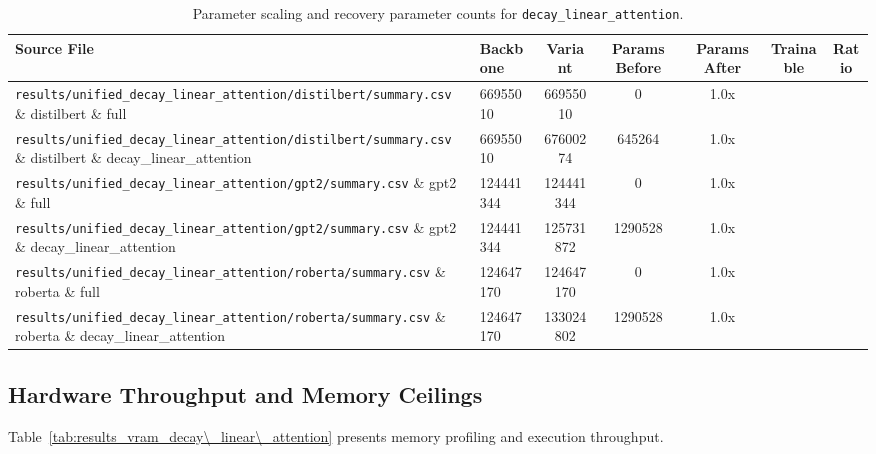 \begin{table}[t]
\centering
\small
\begin{tabularx}{\linewidth}{llccccc}
\toprule
\textbf{Source File} & \textbf{Backbone} & \textbf{Variant} & \textbf{Params Before} & \textbf{Params After} & \textbf{Trainable} & \textbf{Ratio} \\
\midrule
\texttt{results/unified\_decay\_linear\_attention/distilbert/summary.csv} \& distilbert \& full & 66955010 & 66955010 & 0 & 1.0x \\
\texttt{results/unified\_decay\_linear\_attention/distilbert/summary.csv} \& distilbert \& decay\_linear\_attention & 66955010 & 67600274 & 645264 & 1.0x \\
\texttt{results/unified\_decay\_linear\_attention/gpt2/summary.csv} \& gpt2 \& full & 124441344 & 124441344 & 0 & 1.0x \\
\texttt{results/unified\_decay\_linear\_attention/gpt2/summary.csv} \& gpt2 \& decay\_linear\_attention & 124441344 & 125731872 & 1290528 & 1.0x \\
\texttt{results/unified\_decay\_linear\_attention/roberta/summary.csv} \& roberta \& full & 124647170 & 124647170 & 0 & 1.0x \\
\texttt{results/unified\_decay\_linear\_attention/roberta/summary.csv} \& roberta \& decay\_linear\_attention & 124647170 & 133024802 & 1290528 & 1.0x \\
\bottomrule
\end{tabularx}
\caption{Parameter scaling and recovery parameter counts for \texttt{decay\_linear\_attention}.}
\label{tab:results_params_decay\_linear\_attention}
\end{table}

\subsection{Hardware Throughput and Memory Ceilings}
Table~\ref{tab:results_vram_decay\_linear\_attention} presents memory profiling and execution throughput.

